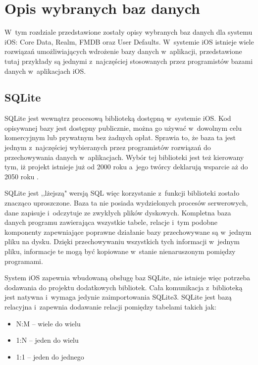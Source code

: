 \section{Opis wybranych baz danych}

 W~tym rozdziale przedstawione zostały opisy wybranych baz danych dla systemu iOS: Core Data, Realm, FMDB oraz User Defaults. W~systemie iOS istnieje wiele rozwiązań umożliwiających wdrożenie bazy danych w~aplikacji, przedstawione tutaj przykłady są jednymi z~najczęściej stosowanych przez programistów bazami danych w~aplikacjach iOS.

\subsection{SQLite}
SQLite jest wewnątrz procesową biblioteką dostępną w~systemie iOS. Kod opisywanej bazy jest dostępny publicznie, można go używać w~dowolnym celu komercyjnym lub prywatnym bez żadnych opłat. Sprawia to, że baza ta jest jednym z~najczęściej wybieranych przez programistów rozwiązań do przechowywania danych w~aplikacjach. Wybór tej biblioteki jest też kierowany tym, iż projekt istnieje już od 2000 roku a~jego twórcy deklarują wsparcie aż do 2050 roku\cite{SQLite-doc} .\par

SQLite jest ,,lżejszą" wersją SQL więc korzystanie z~funkcji biblioteki zostało znacząco uproszczone. Baza ta nie posiada wydzielonych procesów serwerowych, dane zapisuje i~odczytuje ze zwykłych plików dyskowych. Kompletna baza danych programu zawierająca wszystkie tabele, relacje i~tym podobne komponenty zapewniające poprawne działanie bazy przechowywane są w~jednym pliku na dysku. Dzięki przechowywaniu wszystkich tych informacji w~jednym pliku, informacje te mogą być kopiowane w~stanie nienaruszonym pomiędzy programami.\par

System iOS zapewnia wbudowaną obsługę baz SQLite, nie istnieje więc potrzeba dodawania do projektu dodatkowych bibliotek. Cała komunikacja z~biblioteką jest natywna i~wymaga jedynie zaimportowania SQLite3. 
SQLite jest bazą relacyjna i~zapewnia dodawanie relacji pomiędzy tabelami takich jak: 

\begin{itemize}
  \item N:M – wiele do wielu
  \item 1:N – jeden do wielu
  \item 1:1 – jeden do jednego 
\end{itemize}

